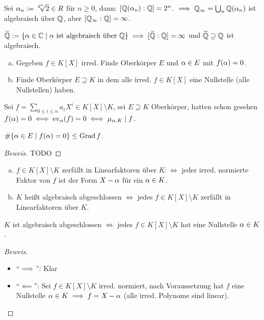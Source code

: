 \documentclass[a4paper]{report}
\begin{document}
\begin{bsp}[Übung]
  Sei $\alpha_{n}:= \sqrt[2^{n}]2 \in R$ für $n \ge 0$, dann: $[\mathbb{Q}(\alpha_{n}): \mathbb{Q}] = 2^{n}$. $\implies \mathbb{Q}_{\infty} = \bigcup_{n}\mathbb{Q}(\alpha_{n})$ ist algebraisch über $\mathbb{Q}$, aber $[\mathbb{Q}_{\infty} : \mathbb{Q}] = \infty$.
\end{bsp}
\begin{bsp*}
$\widetilde {\mathbb{Q}} := \{\alpha \in \mathbb{C} \mid \alpha \text{ ist algebraisch über } \mathbb{Q}\} \implies [\widetilde {\mathbb{Q}} : \mathbb{Q}] = \infty$ und $\widetilde {\mathbb{Q}} \supseteq \mathbb{Q}$ ist algebraisch.
\end{bsp*}
\begin{leitfragen*}
\begin{enumerate}[(a)]
  \item Gegeben $f \in K[X]$ irred. Finde Oberkörper $E$ und $\alpha \in E$ mit $f(\alpha) = 0$.
  \item Finde Oberkörper $E \supseteq K$  in dem alle irred. $f \in K[X]$ eine Nullstelle (alle Nullstellen) haben.
\end{enumerate}
Sei $f = \sum_{0 \le i \le n} a_{i}X^{i} \in K[X] \setminus K$, sei $E \supseteq K$ Oberkörper, hatten schon gesehen $f(\alpha) = 0 \iff \operatorname{ev}_{\alpha}(f) = 0 \iff \mu_{\alpha, K} \mid f$.
\end{leitfragen*}
\begin{prop}
  $\#\{\alpha \in E \mid f(\alpha) = 0\} \le \operatorname{Grad} f$.
  \begin{proof}[Beweis]
    TODO
  \end{proof}
\end{prop}
\begin{defi}
  \begin{enumerate}[(a)]
    \item $f \in K[X] \setminus K$ zerfällt in Linearfaktoren über $K: \iff$ jeder irred. normierte Faktor von $f$ ist der Form $X - \alpha$ für ein $\alpha \in K$.
    \item $K$ heißt algebraisch abgeschlossen $\iff$ jedes $f \in K[X] \setminus K$ zerfällt in Linearfaktoren über $K$.
  \end{enumerate}
\end{defi}

\begin{bem}
  $K$ ist algebraisch abgeschlossen $\iff$ jedes $f \in K[X] \setminus K$ hat eine Nullstelle $\alpha \in K$.
  \begin{proof}[Beweis]\item
\begin{itemize}
\item ``$\implies$'': Klar
\item ``$\impliedby$'': Sei $f \in K[X] \setminus K$ irred. normiert, nach Voraussetzung hat $f$ eine Nullstelle $\alpha \in K \implies f = X - \alpha$ (alle irred. Polynome sind linear).
\end{itemize}
  \end{proof}
\end{bem}
\end{document}
